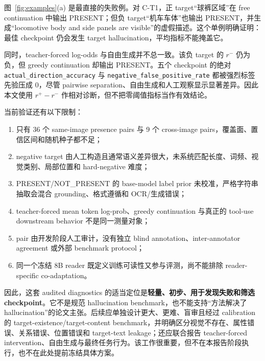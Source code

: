 \documentclass[UTF8,twocolumn,10pt,a4paper]{ctexart}
\newcommand{\code}[1]{\texttt{#1}}
\begin{document}
图~\ref{fig:examples}(a) 是最直接的失败例。对 C-T1，正 target“球裤区域”在 free continuation 中输出 PRESENT；但负 target“机车车体”也输出 PRESENT，并生成“locomotive body and side panels are visible”的虚假描述。这个单例明确证明：最佳 checkpoint 仍会发生 target hallucination，平均指标不能掩盖它。

同时，teacher-forced log-odds 与自由生成并不总一致。该负 target 的 $r^-$ 仍为负，但 greedy continuation 却输出 PRESENT。五个 checkpoint 的绝对 \code{actual\_direction\_accuracy} 与 \code{negative\_false\_positive\_rate} 都被强烈标签先验压成 0，尽管 pairwise separation、自由生成和人工观察显示显著差异。因此本文使用 $r^+-r^-$ 作相对诊断，但不把零阈值指标当作有效结论。

当前验证还有以下限制：
\begin{enumerate}
  \item 只有 36 个 same-image presence pairs 与 9 个 cross-image pairs，覆盖面、置信区间和随机种子都不足；
  \item negative target 由人工构造且通常语义差异很大，未系统匹配长度、词频、视觉类别、局部位置和 hard-negative 难度；
  \item PRESENT/NOT\_PRESENT 的 base-model label prior 未校准，严格字符串抽取会混合 grounding、格式遵循和 OCR/生成错误；
  \item teacher-forced mean token log-prob、greedy continuation 与真正的 tool-use downstream behavior 不是同一测量对象；
  \item pair 由开发阶段人工审计，没有独立 blind annotation、inter-annotator agreement 或外部 benchmark protocol；
  \item 同一个冻结 8B reader 既定义训练可读性又参与评测，尚不能排除 reader-specific co-adaptation。
\end{enumerate}

因此，这套 audited diagnostics 的适当定位是\textbf{轻量、初步、用于发现失败和筛选 checkpoint}。它不是规范 hallucination benchmark，也不能支持“方法解决了 hallucination”的论文主张。后续应单独设计更大、更难、盲审且经过 calibration 的 target-existence/target-content benchmark，并明确区分视觉不存在、属性错误、关系错误、位置错误和 target-text leakage；还应联合报告 teacher-forced intervention、自由生成与最终任务行为。该工作很重要，但不在本报告阶段执行，也不在此处提前冻结具体方案。
\end{document}
